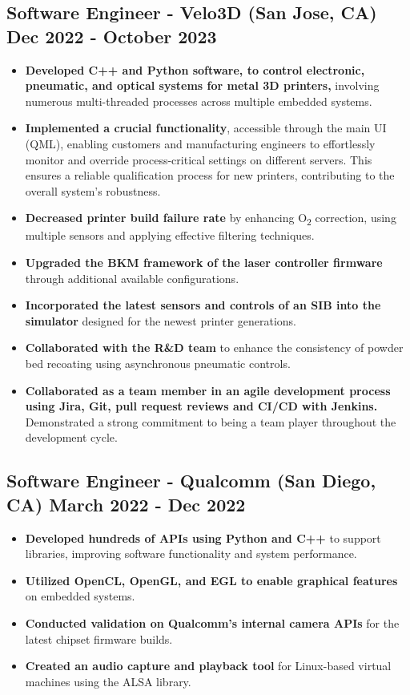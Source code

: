 \documentclass[]{article}
\begin{document}
\vspace{1ex}

\subsection{{\large{Software Engineer - Velo3D} (San Jose, CA) \hfill {\small{Dec 2022 - October 2023}}}}

\begin{itemize}
    \item \textbf{Developed C++ and Python software, to control electronic, pneumatic, and optical systems for metal 3D printers,} involving numerous multi-threaded processes across multiple embedded systems.
    \item \textbf{Implemented a crucial functionality}, accessible through the main UI (QML), enabling customers and manufacturing engineers to effortlessly monitor and override process-critical settings on different servers. 
    This ensures a reliable qualification process for new printers, contributing to the overall system's robustness.
    \item \textbf{Decreased printer build failure rate} by enhancing O\textsubscript{2} correction, using multiple sensors and applying effective filtering techniques.
    \item \textbf{Upgraded the BKM framework of the laser controller firmware} through additional available configurations.
    \item \textbf{Incorporated the latest sensors and controls of an SIB into the simulator} designed for the newest printer generations.
    \item \textbf{Collaborated with the R\&D team} to enhance the consistency of powder bed recoating using asynchronous pneumatic controls.
    \item \textbf{Collaborated as a team member in an agile development process using Jira, Git, pull request reviews and CI/CD with Jenkins.} Demonstrated a strong commitment to being a team player throughout the development cycle.
\end{itemize}

\vspace{2ex}

\subsection{{\large{Software Engineer - Qualcomm} (San Diego, CA) \hfill{\small{March 2022 - Dec 2022}}}}

\begin{itemize}
    \item \textbf{Developed hundreds of APIs using Python and C++} to support libraries, improving software functionality and system performance.
    \item \textbf{Utilized OpenCL, OpenGL, and EGL to enable graphical features} on embedded systems.
    \item \textbf{Conducted validation on Qualcomm's internal camera APIs} for the latest chipset firmware builds. 
    \item \textbf{Created an audio capture and playback tool} for Linux-based virtual machines using the ALSA library.
\end{itemize}
\end{document}
